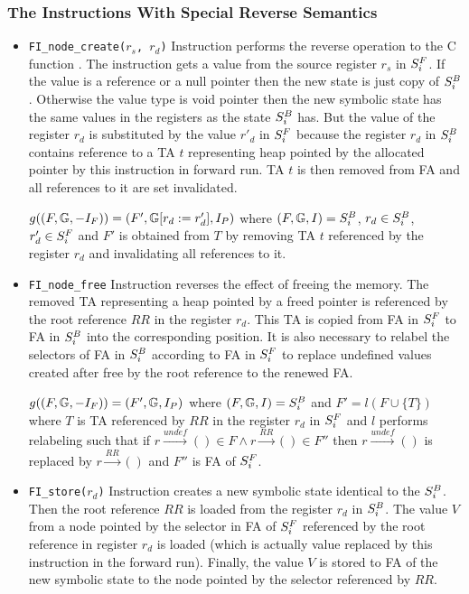 \subsubsection{The Instructions With Special Reverse Semantics}

\begin{itemize}
	\item {\tt FI\_node\_create($r_s$, $r_d$)}
		Instruction performs the reverse operation to the C function .
		The instruction gets a value from the source register $r_s$ in $S^{F}_{i}$.
		If the value is a reference or a null pointer then the new
		state is just copy of $S^{B}_{i}$.
		Otherwise the value type is void pointer then the new symbolic
		state has the same values in the registers as the state $S^{B}_{i}$ has.
		But the value of the register $r_d$ is substituted by the value $r'_{d}$ in $S^{F}_{i}$
		because the register $r_d$ in $S^{B}_{i}$ contains reference to a TA $t$
		representing heap pointed by the allocated pointer by this instruction in forward run.
		TA $t$ is then removed from FA and all references to it are set invalidated.

		$g((F, \mathbb{G}, -I_{F})) = (F', \mathbb{G} [r_{d} := r'_{d}]
			, I_{P})$
			where $(F, \mathbb{G}, I) = S^{B}_{i}$,
			$r_{d} \in S^{B}_{i}$, $r'_{d} \in S^{F}_{i}$
			and $F'$ is obtained from $T$ by removing TA $t$ referenced by the register $r_d$
			and invalidating all references to it.

	\item {\tt FI\_node\_free}
		Instruction reverses the effect of freeing the memory.
		The removed TA representing a heap pointed by a freed pointer
		is referenced by the root reference $RR$ in the register $r_d$.
		This TA is copied from FA in $S^{F}_{i}$ to FA in $S^{B}_{i}$ into the
		corresponding position.
		It is also necessary to relabel the selectors of FA in $S^{B}_{i}$
		according to FA in $S^{F}_{i}$ to replace undefined values created
		after free by the root reference to the renewed FA.

		$g((F, \mathbb{G}, -I_{F})) = (F', \mathbb{G}, I_{P})$
			where $(F, \mathbb{G}, I) = S^{B}_{i}$ and $F'= l(F \cup \{T\})$ where
			$T$ is TA referenced by $RR$ in the register $r_d$ in $S^{F}_{i}$
			and $l$ performs relabeling such that if $r \xrightarrow{undef} () \in F
			\wedge r \xrightarrow{RR} () \in F''$ then $r \xrightarrow{undef} ()$ is
			replaced by $r \xrightarrow{RR} ()$ and $F''$ is FA of $S^{F}_{i}$.

	\item {\tt FI\_store($r_d$)}
		Instruction creates a new symbolic state identical to the $S^{B}_{i}$.
		Then the root reference $RR$ is loaded from the register $r_d$ in $S^{B}_{i}$.
		The value $V$ from a node pointed by the selector in FA of $S^{F}_{i}$ referenced by
		the root reference in register $r_d$ is loaded (which is actually value replaced
		by this instruction in the forward run).
		Finally, the value $V$ is stored to FA of the new symbolic state to the node
		pointed by the selector referenced by $RR$.


\end{itemize}
